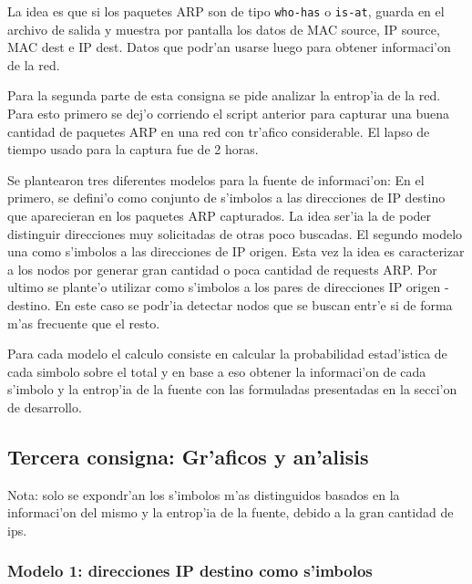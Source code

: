 \documentclass[a4paper,10pt]{article}
\begin{document}
La idea es que si los paquetes ARP son de tipo \texttt{who-has} o \texttt{is-at}, guarda en el archivo de salida y muestra por pantalla los datos de MAC source, IP source, MAC dest e IP dest. Datos que podr'an usarse luego para obtener informaci'on de la red.

\vspace*{5 mm}

Para la segunda parte de esta consigna se pide analizar la entrop'ia de la red. Para esto primero se dej'o corriendo el script anterior para capturar una buena cantidad de paquetes ARP en una red con tr'afico considerable. El lapso de tiempo usado para la captura fue de 2 horas. 

\vspace*{5 mm}

Se plantearon tres diferentes modelos para la fuente de informaci'on: En el primero, se defini'o como conjunto de s'imbolos a las direcciones de IP destino que aparecieran en los paquetes ARP capturados. La idea ser'ia la de poder distinguir direcciones muy solicitadas de otras poco buscadas. El segundo modelo una como s'imbolos a las direcciones de IP origen. Esta vez la idea es caracterizar a los nodos por generar gran cantidad o poca cantidad de requests ARP. Por ultimo se plante'o utilizar como s'imbolos a los pares de direcciones IP origen - destino. En este caso se podr'ia detectar nodos que se buscan entr'e si de forma m'as frecuente que el resto. 

\vspace*{5 mm}

Para cada modelo el calculo consiste en calcular la probabilidad estad'istica de cada simbolo sobre el total y en base a eso obtener la informaci'on de cada s'imbolo y la entrop'ia de la fuente con las formuladas presentadas en la secci'on de desarrollo.

\subsection{Tercera consigna: Gr'aficos y an'alisis}
\label{expli1:}

Nota: solo se expondr'an los s'imbolos m'as distinguidos basados en la informaci'on del mismo y la entrop'ia de la fuente, debido a la gran cantidad de ips. \\

\subsubsection{Modelo 1: direcciones IP destino como s'imbolos}
\end{document}
